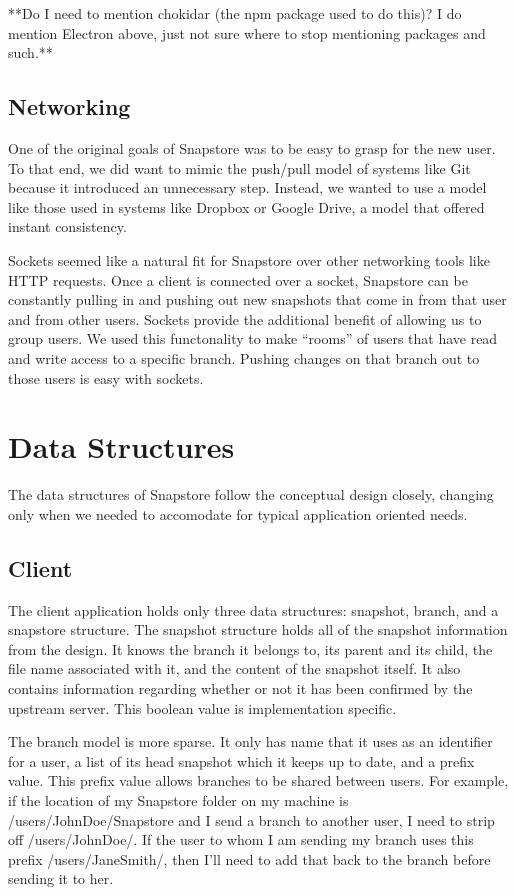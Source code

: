 **Do I need to mention chokidar (the npm package used to do this)? I do mention Electron above, just not sure where to stop mentioning packages and such.**

\subsection{Networking}

One of the original goals of Snapstore was to be easy to grasp for the new user. To that end, we did want to mimic the push/pull model of systems like Git because it introduced an unnecessary step. Instead, we wanted to use a model like those used in systems like Dropbox or Google Drive, a model that offered instant consistency.

Sockets seemed like a natural fit for Snapstore over other networking tools like HTTP requests. Once a client is connected over a socket, Snapstore can be constantly pulling in and pushing out new snapshots that come in from that user and from other users. Sockets provide the additional benefit of allowing us to group users. We used this functonality to make ``rooms'' of users that have read and write access to a specific branch. Pushing changes on that branch out to those users is easy with sockets.

\section{Data Structures}

The data structures of Snapstore follow the conceptual design closely, changing only when we needed to accomodate for typical application oriented needs.

\subsection{Client}

The client application holds only three data structures: snapshot, branch, and a snapstore structure. The snapshot structure holds all of the snapshot information from the design. It knows the branch it belongs to, its parent and its child, the file name associated with it, and the content of the snapshot itself. It also contains information regarding whether or not it has been confirmed by the upstream server. This boolean value is implementation specific.

The branch model is more sparse. It only has name that it uses as an identifier for a user, a list of its head snapshot which it keeps up to date, and a prefix value. This prefix value allows branches to be shared between users. For example, if the location of my Snapstore folder on my machine is /users/JohnDoe/Snapstore and I send a branch to another user, I need to strip off /users/JohnDoe/. If the user to whom I am sending my branch uses this prefix /users/JaneSmith/, then I'll need to add that back to the branch before sending it to her.


